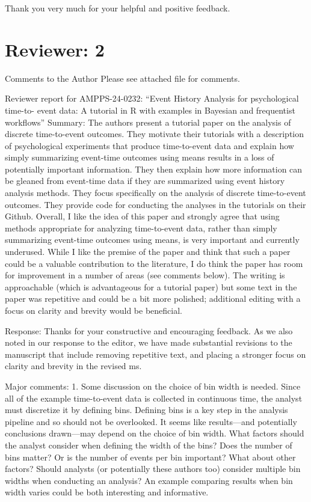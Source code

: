 \documentclass[
]{article}
\renewenvironment{quote}{\begin{leftbar}}{\end{leftbar}}
\begin{document}
Thank you very much for your helpful and positive feedback.

\section{Reviewer: 2}\label{reviewer-2}

\begin{quote}
Comments to the Author Please see attached file for comments.
\end{quote}

\begin{quote}
Reviewer report for AMPPS-24-0232: ``Event History Analysis for
psychological time-to- event data: A tutorial in R with examples in
Bayesian and frequentist workflows'' Summary: The authors present a
tutorial paper on the analysis of discrete time-to-event outcomes. They
motivate their tutorials with a description of psychological experiments
that produce time-to-event data and explain how simply summarizing
event-time outcomes using means results in a loss of potentially
important information. They then explain how more information can be
gleaned from event-time data if they are summarized using event history
analysis methods. They focus specifically on the analysis of discrete
time-to-event outcomes. They provide code for conducting the analyses in
the tutorials on their Github. Overall, I like the idea of this paper
and strongly agree that using methods appropriate for analyzing
time-to-event data, rather than simply summarizing event-time outcomes
using means, is very important and currently underused. While I like the
premise of the paper and think that such a paper could be a valuable
contribution to the literature, I do think the paper has room for
improvement in a number of areas (see comments below). The writing is
approachable (which is advantageous for a tutorial paper) but some text
in the paper was repetitive and could be a bit more polished; additional
editing with a focus on clarity and brevity would be beneficial.
\end{quote}

Response: Thanks for your constructive and encouraging feedback. As we
also noted in our response to the editor, we have made substantial
revisions to the manuscript that include removing repetitive text, and
placing a stronger focus on clarity and brevity in the revised ms.

\begin{quote}
Major comments: 1. Some discussion on the choice of bin width is needed.
Since all of the example time-to-event data is collected in continuous
time, the analyst must discretize it by defining bins. Defining bins is
a key step in the analysis pipeline and so should not be overlooked. It
seems like results---and potentially conclusions drawn---may depend on
the choice of bin width. What factors should the analyst consider when
defining the width of the bins? Does the number of bins matter? Or is
the number of events per bin important? What about other factors? Should
analysts (or potentially these authors too) consider multiple bin widths
when conducting an analysis? An example comparing results when bin width
varies could be both interesting and informative.
\end{quote}
\end{document}
